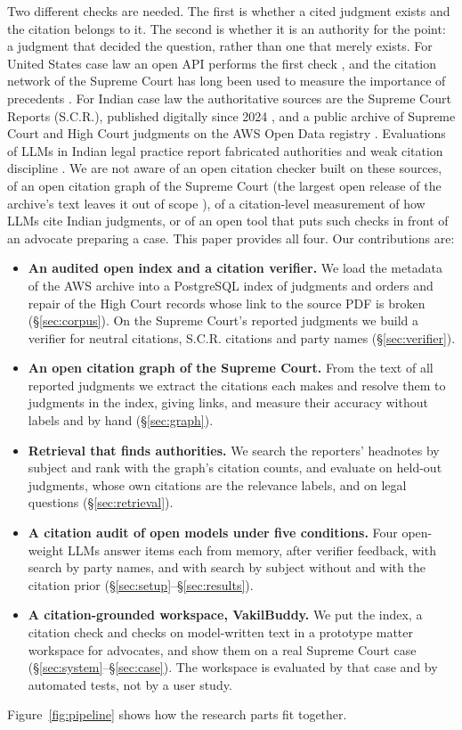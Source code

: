 \documentclass[conference]{IEEEtran}
\begin{document}
Two different checks are needed. The first is whether a cited judgment exists and the citation belongs to it. The second is whether it is an authority for the point: a judgment that decided the question, rather than one that merely exists. For United States case law an open API performs the first check \cite{courtlistenerapi}, and the citation network of the Supreme Court has long been used to measure the importance of precedents \cite{fowler2007}. For Indian case law the authoritative sources are the Supreme Court Reports (S.C.R.), published digitally since 2024 \cite{digiscr}, and a public archive of Supreme Court and High Court judgments on the AWS Open Data registry \cite{awssc,awshc}. Evaluations of LLMs in Indian legal practice report fabricated authorities and weak citation discipline \cite{hemrajani2025,juvekar2025}. We are not aware of an open citation checker built on these sources, of an open citation graph of the Supreme Court (the largest open release of the archive's text leaves it out of scope \cite{openindialaw}), of a citation-level measurement of how LLMs cite Indian judgments, or of an open tool that puts such checks in front of an advocate preparing a case. This paper provides all four. Our contributions are:
\begin{itemize}
\item \textbf{An audited open index and a citation verifier.} We load the metadata of the AWS archive into a PostgreSQL index of \CorpusTotal{} judgments and orders and repair \MobileLinkedPct{} of the \MobileTotal{} High Court records whose link to the source PDF is broken (\S\ref{sec:corpus}). On the Supreme Court's \CorpusSC{} reported judgments we build a verifier for neutral citations, S.C.R. citations and party names (\S\ref{sec:verifier}).
\item \textbf{An open citation graph of the Supreme Court.} From the text of all \GraphTextOK{} reported judgments we extract the citations each makes and resolve them to judgments in the index, giving \GraphEdges{} links, and measure their accuracy without labels and by hand (\S\ref{sec:graph}).
\item \textbf{Retrieval that finds authorities.} We search the reporters' headnotes by subject and rank with the graph's citation counts, and evaluate on \RecNTest{} held-out judgments, whose own citations are the relevance labels, and on \NumTopics{} legal questions (\S\ref{sec:retrieval}).
\item \textbf{A citation audit of open models under five conditions.} Four open-weight LLMs answer \NumItems{} items each from memory, after verifier feedback, with search by party names, and with search by subject without and with the citation prior (\S\ref{sec:setup}--\S\ref{sec:results}).
\item \textbf{A citation-grounded workspace, VakilBuddy.} We put the index, a citation check and checks on model-written text in a prototype matter workspace for advocates, and show them on a real Supreme Court case (\S\ref{sec:system}--\S\ref{sec:case}). The workspace is evaluated by that case and by automated tests, not by a user study.
\end{itemize}
Figure~\ref{fig:pipeline} shows how the research parts fit together.
\end{document}
